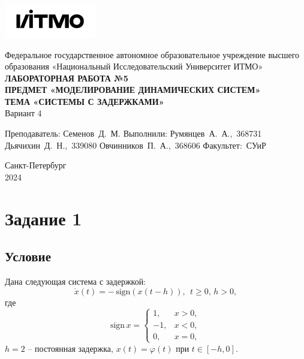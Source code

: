 \documentclass[a4paper, 12pt]{article}
\begin{document}
    \begin{titlepage}

        \begin{center}
        \includegraphics[width=0.3\textwidth]{itmo.png}
        \vfill
        
        Федеральное государственное автономное образовательное учреждение высшего образования
        «Национальный Исследовательский Университет ИТМО»\\
            
        \vfill
        {\large\bf ЛАБОРАТОРНАЯ РАБОТА №5}\\
        {\large\bf ПРЕДМЕТ «МОДЕЛИРОВАНИЕ ДИНАМИЧЕСКИХ СИСТЕМ»}\\
        {\large\bf ТЕМА «СИСТЕМЫ С ЗАДЕРЖКАМИ»}\\
        Вариант 4
        \vfill

        \begin{flushright}
            \begin{minipage}{.45\textwidth}
            {
                \hbox{Преподаватель:}
                \hbox{Семенов Д. М.}
                \hbox{}
                \hbox{Выполнили:}
                \hbox{Румянцев А. А., 368731}
                \hbox{Дьячихин Д. Н., 339080}
                \hbox{Овчинников П. А., 368606}
                \hbox{}
                \hbox{Факультет: СУиР}
            }
            \end{minipage}
        \end{flushright}
        
        \vfill
                
        Санкт-Петербург\\
        2024
        \end{center}
    \end{titlepage}
    
    \tableofcontents

    \newpage
    \section{Задание 1}
    \subsection{Условие}
    Дана следующая система с задержкой: $$\dot{x}(t)=-\,\text{sign}(x(t-h)),\ \ t\geq0,\,h>0,$$
    где $$\text{sign}\,x=
    \begin{cases}
        1, & x>0,\\
        -1, & x<0,\\
        0, & x=0,
    \end{cases}$$
    $h=2$ -- постоянная задержка, $x(t)=\varphi(t)$ при $t\in[-h,0]$.
\end{document}
